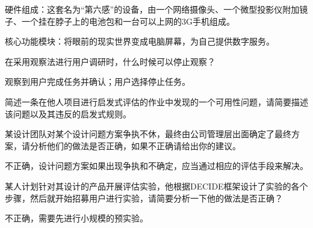 \begin{solution}
硬件组成：这套名为“第六感”的设备，由一个网络摄像头、一个微型投影仪附加镜子、一个挂在脖子上的电池包和一台可以上网的3G手机组成。

核心功能模块：将眼前的现实世界变成电脑屏幕，为自己提供数字服务。
\end{solution}



\begin{problem}
在采用观察法进行用户调研时，什么时候可以停止观察？
\end{problem}

\begin{solution}
观察到用户完成任务并确认；用户选择停止任务。
\end{solution}



\begin{problem}
简述一条在他人项目进行启发式评估的作业中发现的一个可用性问题，请简要描述该问题以及其违反的启发式规则。
\end{problem}



\begin{problem}
某设计团队对某个设计问题方案争执不休，最终由公司管理层出面确定了最终方案，请分析他们的做法是否正确，如果不正确请给出你的建议。
\end{problem}

\begin{solution}
不正确，设计问题方案如果出现争执和不确定，应当通过相应的评估手段来解决。
\end{solution}



\begin{problem}
某人计划针对其设计的产品开展评估实验，他根据DECIDE框架设计了实验的各个步骤，然后就开始招募用户进行实验，请简要分析一下他的做法是否正确？
\end{problem}

\begin{solution}
不正确，需要先进行小规模的预实验。
\end{solution}

